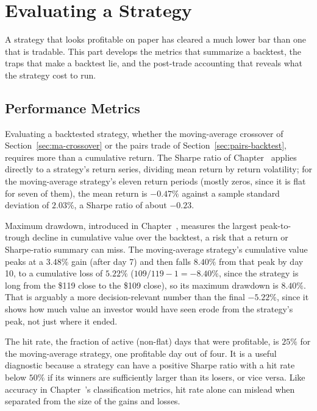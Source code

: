 \documentclass[../ai_in_finance]{subfiles}
\begin{document}
\section{Evaluating a Strategy}

A strategy that looks profitable on paper has cleared a much lower bar than one that is tradable. This part develops the metrics that summarize a backtest, the traps that make a backtest lie, and the post-trade accounting that reveals what the strategy cost to run.

\subsection{Performance Metrics}
\label{sec:backtest-metrics}

Evaluating a backtested strategy, whether the moving-average crossover of Section~\ref{sec:ma-crossover} or the pairs trade of Section~\ref{sec:pairs-backtest}, requires more than a cumulative return. The Sharpe ratio of Chapter~ applies directly to a strategy's return series, dividing mean return by return volatility; for the moving-average strategy's eleven return periods (mostly zeros, since it is flat for seven of them), the mean return is $-0.47\%$ against a sample standard deviation of $2.03\%$, a Sharpe ratio of about $-0.23$.

Maximum drawdown, introduced in Chapter~, measures the largest peak-to-trough decline in cumulative value over the backtest, a risk that a return or Sharpe-ratio summary can miss. The moving-average strategy's cumulative value peaks at a $3.48\%$ gain (after day 7) and then falls $8.40\%$ from that peak by day 10, to a cumulative loss of $5.22\%$ ($109/119 - 1 = -8.40\%$, since the strategy is long from the \$119 close to the \$109 close), so its maximum drawdown is $8.40\%$. That is arguably a more decision-relevant number than the final $-5.22\%$, since it shows how much value an investor would have seen erode from the strategy's peak, not just where it ended.

The hit rate, the fraction of active (non-flat) days that were profitable, is $25\%$ for the moving-average strategy, one profitable day out of four. It is a useful diagnostic because a strategy can have a positive Sharpe ratio with a hit rate below $50\%$ if its winners are sufficiently larger than its losers, or vice versa. Like accuracy in Chapter~'s classification metrics, hit rate alone can mislead when separated from the size of the gains and losses.
\end{document}
